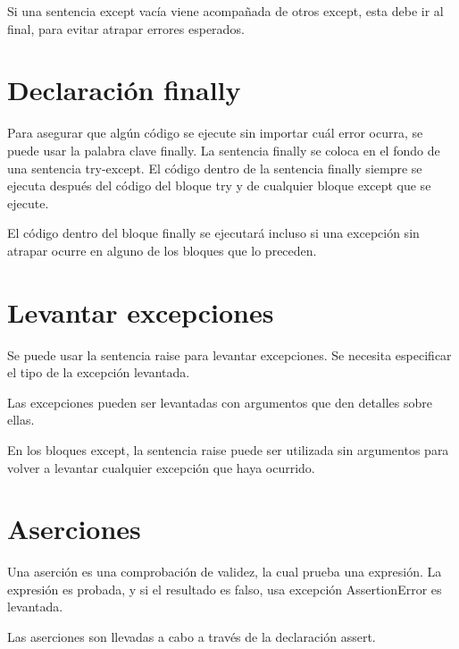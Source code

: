 \documentclass{report}
\begin{document}
Si una sentencia except vacía viene acompañada de otros except, esta debe ir al final, para evitar atrapar errores esperados.

\section{Declaración finally}

Para asegurar que algún código se ejecute sin importar cuál error ocurra, se puede usar la palabra clave finally. La sentencia finally se coloca en el fondo de una sentencia try-except. El código dentro de la sentencia finally siempre se ejecuta después del código del bloque try y de cualquier bloque except que se ejecute.


El código dentro del bloque finally se ejecutará incluso si una excepción sin atrapar ocurre en alguno de los bloques que lo preceden.


\section{Levantar excepciones}

Se puede usar la sentencia raise para levantar excepciones. Se necesita especificar el tipo de la excepción levantada.


Las excepciones pueden ser levantadas con argumentos que den detalles sobre ellas.



En los bloques except, la sentencia raise puede ser utilizada sin argumentos para volver a levantar cualquier excepción que haya ocurrido.


\section{Aserciones}

Una aserción es una comprobación de validez, la cual prueba una expresión. La expresión es probada, y si el resultado es falso, usa excepción AssertionError es levantada.

Las aserciones son llevadas a cabo a través de la declaración assert.
\end{document}
